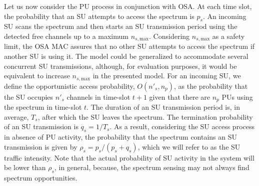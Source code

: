 Let us now consider the PU process in conjunction with OSA. At each time slot, the probability that an SU attempts to access the spectrum is $p_{s}$.
An incoming SU scans the spectrum and then starts an SU transmission period using the detected free channels up to a maximum $n_{s,\text{max}}$. Considering $n_{s,\text{max}}$ as a safety limit, the OSA MAC assures that no other SU attempts to access the spectrum if another SU is using it. The model could be generalized to accommodate several concurrent SU transmissions, although, for evaluation purposes, it would be equivalent to increase $n_{s,\text{max}}$ in the presented model.  
For an incoming SU, we define the opportunistic access probability, $O\left(n'_{s},n_{p}\right)$, as the probability that the SU occupies $n'_{s}$ channels in time-slot $t+1$ given that there are $n_{p}$ PUs using the spectrum in time-slot $t$.
The duration of an SU transmission period is, in average, $T_{s}$, after which the SU leaves the spectrum. The termination probability of an SU transmission is $q_{s}=1/T_{s}$.
As a result, considering the SU access process in absence of PU activity, the probability that the spectrum contains an SU transmission is given by $\rho_{s}=p_{s}/(p_{s}+q_{s})$, which we will refer to as the SU traffic intensity. Note that the actual probability of SU activity in the system will be lower than $\rho_{s}$, in general, because, the spectrum sensing may not always find spectrum opportunities.


